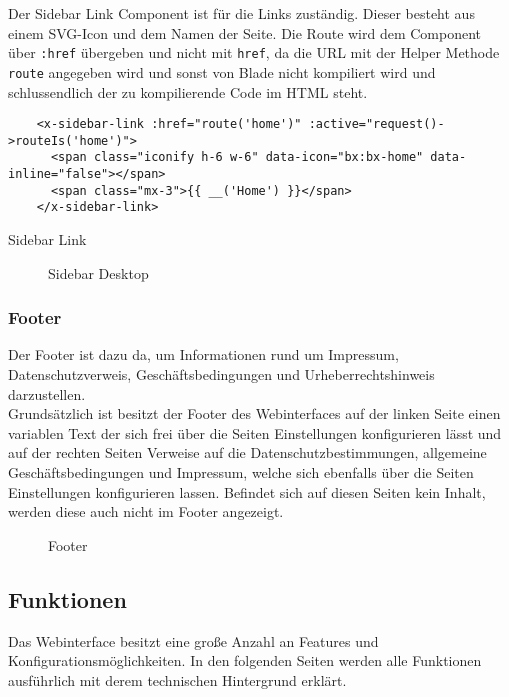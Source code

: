 Der Sidebar Link Component ist für die Links zuständig. Dieser besteht aus einem
\acs*{SVG}-Icon und dem Namen der Seite. Die Route wird dem Component über
\verb|:href| übergeben und nicht mit \verb|href|, da die URL mit der Helper
Methode \verb|route| angegeben wird und sonst von Blade nicht kompiliert wird
und schlussendlich der zu kompilierende Code im HTML steht.

\begin{listing}[H]
  \begin{verbatim}
    <x-sidebar-link :href="route('home')" :active="request()->routeIs('home')">
      <span class="iconify h-6 w-6" data-icon="bx:bx-home" data-inline="false"></span>
      <span class="mx-3">{{ __('Home') }}</span>
    </x-sidebar-link>
  \end{verbatim}
  \caption{Sidebar Link}
\end{listing}
\begin{figure}[H]
  \centering
  \caption{Sidebar Desktop}
\end{figure}

\subsubsection{Footer}
Der Footer ist dazu da, um Informationen rund um Impressum, Datenschutzverweis,
Geschäftsbedingungen und Urheberrechtshinweis darzustellen.\\

Grundsätzlich ist besitzt der Footer des Webinterfaces auf der linken Seite
einen variablen Text der sich frei über die Seiten Einstellungen konfigurieren
lässt und auf der rechten Seiten Verweise auf die Datenschutzbestimmungen,
allgemeine Geschäftsbedingungen und Impressum, welche sich ebenfalls über die
Seiten Einstellungen konfigurieren lassen. Befindet sich auf diesen Seiten kein
Inhalt, werden diese auch nicht im Footer angezeigt.

\begin{figure}[H]
  \centering
  \caption{Footer}
\end{figure}

\subsection{Funktionen}
Das Webinterface besitzt eine große Anzahl an Features und
Konfigurationsmöglichkeiten. In den folgenden Seiten werden alle Funktionen
ausführlich mit derem technischen Hintergrund erklärt.

